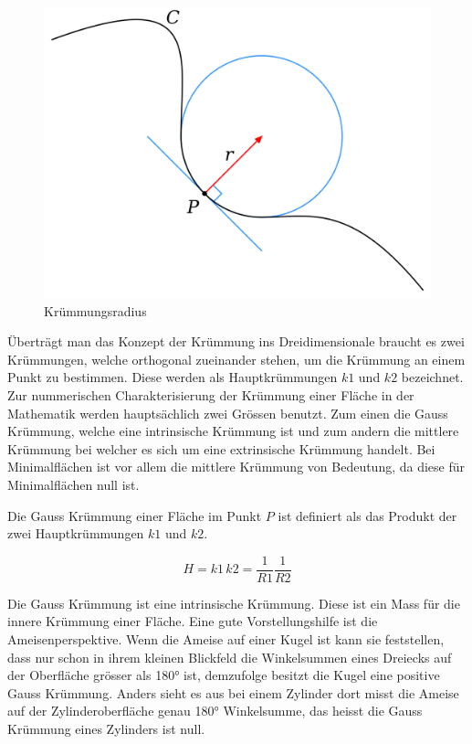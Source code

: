 \begin{refsection}
\begin{figure} 
  \centering
  \includegraphics[scale=0.1]{minimal/Kruemmungsradius.png}
  \caption{Krümmungsradius} 
\end{figure}

Überträgt man das Konzept der Krümmung ins Dreidimensionale braucht es zwei Krümmungen, welche orthogonal zueinander stehen, um die Krümmung an einem Punkt zu bestimmen. Diese werden als Hauptkrümmungen $k1$ und $k2$ bezeichnet.
Zur nummerischen Charakterisierung der Krümmung einer Fläche in der Mathematik werden hauptsächlich zwei Grössen benutzt.
Zum einen die Gauss Krümmung, welche eine intrinsische Krümmung ist und zum andern die mittlere Krümmung bei welcher es sich um eine extrinsische Krümmung handelt. Bei Minimalflächen ist vor allem die mittlere Krümmung von Bedeutung, da diese für Minimalflächen null ist.



Die Gauss Krümmung einer Fläche im Punkt $P$ ist definiert als das Produkt der zwei Hauptkrümmungen $k1$ und $k2$.

\begin{equation} \label{Gauss_Kruemmung_D}
  H=k1\, k2= \frac{1}{R1}\frac{1}{R2}
\end{equation}



Die Gauss Krümmung ist eine intrinsische Krümmung. Diese ist  ein Mass für die innere Krümmung einer Fläche. 
Eine gute Vorstellungshilfe ist die Ameisenperspektive. 
Wenn die Ameise auf einer Kugel ist kann sie feststellen, dass nur schon in ihrem kleinen Blickfeld die Winkelsummen eines Dreiecks auf der Oberfläche grösser als 180° ist, demzufolge besitzt die Kugel eine positive Gauss Krümmung. Anders sieht es aus bei einem Zylinder dort misst die Ameise auf der Zylinderoberfläche genau 180° Winkelsumme, das heisst die Gauss Krümmung eines Zylinders ist null.


\end{refsection}
